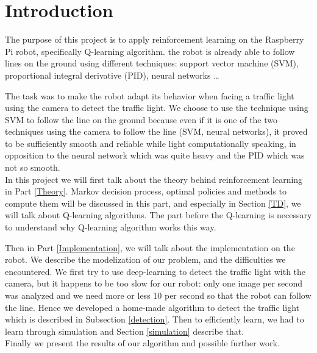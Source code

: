 \documentclass[14pt,a4paper]{article}
\theoremstyle{definition}
\begin{document}
\tableofcontents
{}
\newpage
{}





\section*{Introduction}

The purpose of this project is to apply reinforcement learning on the Raspberry Pi robot, specifically Q-learning algorithm. the robot is already able to follow lines on the ground using different techniques: support vector machine (SVM), proportional integral derivative (PID), neural networks \ldots 

The task was to make the robot adapt its behavior when facing a traffic light using the camera to detect the traffic light. We choose to use the technique using SVM to follow the line on the ground because even if it is one of the two techniques using the camera to follow the line (SVM, neural networks), it proved to be sufficiently smooth and reliable while light computationally speaking, in opposition to the neural network which was quite heavy and the PID which was not so smooth.\\


In this project we will first talk about the theory behind reinforcement learning in Part \ref{Theory}. Markov decision process, optimal policies and methods to compute them will be discussed in this part, and especially in Section \ref{TD}, we will talk about Q-learning algorithms.  The part before the Q-learning is necessary to understand why Q-learning algorithm works this way.

Then in Part \ref{Implementation}, we will talk about the implementation on the robot. We describe the modelization of our problem, and the difficulties we encountered.  We first try to use deep-learning to detect the traffic light with the camera, but it happens to be too slow for our robot: only one image per second was analyzed and we need more or less 10 per second so that the robot can follow the line. Hence we developed a home-made algorithm to detect the traffic light which is described in Subsection \ref{detection}. Then to efficiently learn, we had to learn through simulation and Section \ref{simulation} describe that. \\

Finally we present the results of our algorithm and possible further work.
\end{document}
